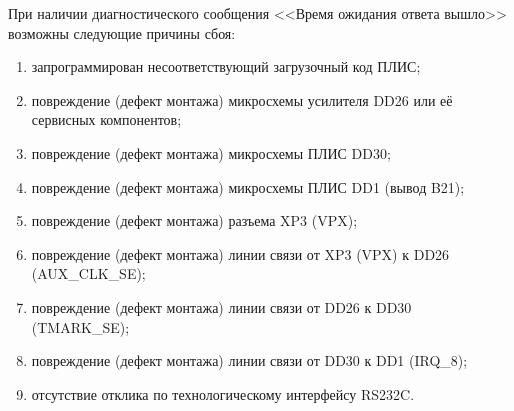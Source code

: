   \begin{sloppypar}
    \subpoint При наличии диагностического сообщения <<Время ожидания ответа вышло>> возможны следующие причины сбоя:
      \begin{enumerate}
	\item запрограммирован несоответствующий загрузочный код ПЛИС;
	\item повреждение (дефект монтажа) микросхемы усилителя DD26 или её сервисных компонентов;
	\item повреждение (дефект монтажа) микросхемы ПЛИС DD30;
	\item повреждение (дефект монтажа) микросхемы ПЛИС DD1 (вывод B21);
	\item повреждение (дефект монтажа) разъема XP3 (VPX);
	\item повреждение (дефект монтажа) линии связи от XP3 (VPX) к DD26 (AUX\_CLK\_SE);
	\item повреждение (дефект монтажа) линии связи от DD26 к DD30 (TMARK\_SE);
	\item повреждение (дефект монтажа) линии связи от DD30 к DD1 (IRQ\_8);
	\item отсутствие отклика по технологическому интерфейсу RS232C.
      \end{enumerate}
  \end{sloppypar}      


\begin{comment}
\section{Возможные неисправности и методы их корректировки}
\label{failure_reasons}  
UART[0]\_SOUT K49
UART[0]\_SIN K46  
UART[2]\_SOUT K53
UART[2]\_SIN K42
UART[3]\_SOUT K54
UART[3]\_SIN K43  
IIC[1]\_SDA K47
IIC[1]\_SCL K44  
IIC[2]\_SDA K55
IIC[2]\_SCL K50  
SPI\_MOSI K48
SPI\_MISO K45
SPI\_CLK K56
SPI\_CS0\# K51  
NVRAM1\_CS\#
NVRAM2\_CS\#  
IIC\_INT\_SDA  K57
IIC\_INT\_SCL K60  
SM0
SM1  
MSDA
MSCL  
\end{comment}

